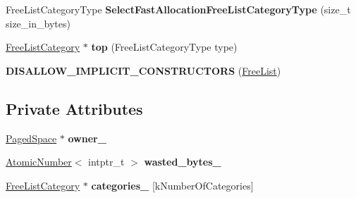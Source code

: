 \begin{DoxyCompactItemize}
\item 
Free\+List\+Category\+Type {\bfseries Select\+Fast\+Allocation\+Free\+List\+Category\+Type} (size\+\_\+t size\+\_\+in\+\_\+bytes)\hypertarget{classv8_1_1internal_1_1_free_list_a9c6430faabf557fb10fa199d9d03054e}{}\label{classv8_1_1internal_1_1_free_list_a9c6430faabf557fb10fa199d9d03054e}

\item 
\hyperlink{classv8_1_1internal_1_1_free_list_category}{Free\+List\+Category} $\ast$ {\bfseries top} (Free\+List\+Category\+Type type)\hypertarget{classv8_1_1internal_1_1_free_list_a7a16be3eb48d8f799dc491a55620147d}{}\label{classv8_1_1internal_1_1_free_list_a7a16be3eb48d8f799dc491a55620147d}

\item 
{\bfseries D\+I\+S\+A\+L\+L\+O\+W\+\_\+\+I\+M\+P\+L\+I\+C\+I\+T\+\_\+\+C\+O\+N\+S\+T\+R\+U\+C\+T\+O\+RS} (\hyperlink{classv8_1_1internal_1_1_free_list}{Free\+List})\hypertarget{classv8_1_1internal_1_1_free_list_aa328258b31c54b3ced01d63237dfddbb}{}\label{classv8_1_1internal_1_1_free_list_aa328258b31c54b3ced01d63237dfddbb}

\end{DoxyCompactItemize}
\subsection*{Private Attributes}
\begin{DoxyCompactItemize}
\item 
\hyperlink{classv8_1_1internal_1_1_paged_space}{Paged\+Space} $\ast$ {\bfseries owner\+\_\+}\hypertarget{classv8_1_1internal_1_1_free_list_aa3b59f3d0692294001155efb949dbb65}{}\label{classv8_1_1internal_1_1_free_list_aa3b59f3d0692294001155efb949dbb65}

\item 
\hyperlink{classv8_1_1internal_1_1_atomic_number}{Atomic\+Number}$<$ intptr\+\_\+t $>$ {\bfseries wasted\+\_\+bytes\+\_\+}\hypertarget{classv8_1_1internal_1_1_free_list_a6e661c56e5e5952b34742374fdd855fa}{}\label{classv8_1_1internal_1_1_free_list_a6e661c56e5e5952b34742374fdd855fa}

\item 
\hyperlink{classv8_1_1internal_1_1_free_list_category}{Free\+List\+Category} $\ast$ {\bfseries categories\+\_\+} \mbox{[}k\+Number\+Of\+Categories\mbox{]}\hypertarget{classv8_1_1internal_1_1_free_list_a6c12dc70f5ea7554e244bc27f0a6aab8}{}\label{classv8_1_1internal_1_1_free_list_a6c12dc70f5ea7554e244bc27f0a6aab8}

\end{DoxyCompactItemize}
